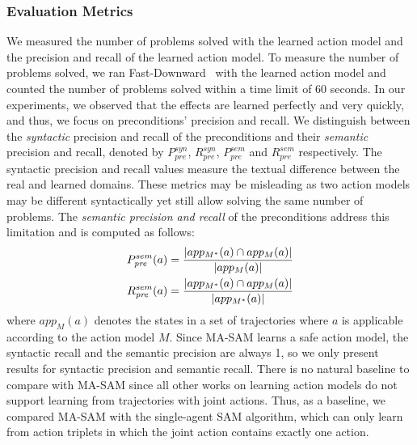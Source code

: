 \documentclass[letterpaper]{article} %
\newcommand{\pre}{\textit{pre}}
\theoremstyle{definition}
\theoremstyle{remark}
\newcommand{\realm}{\ensuremath{M^*}\xspace}
\newcommand{\sam}{\ac{SAM}\xspace}
\newcommand{\masam}{\ac{MA-SAM}\xspace}
\begin{document}
\subsubsection{Evaluation Metrics}
We measured the number of problems solved with the learned action model 
and the precision and recall of the learned action model. 
To measure the number of problems solved, 
we ran Fast-Downward~\cite{helmert2006fast} with 
the learned action model and counted the number of problems solved within a time limit of 60 seconds. %
In our experiments, we observed that the effects are learned perfectly and very quickly, and thus, we focus on preconditions' precision and recall.  
We distinguish between the \textit{syntactic} precision and recall of the preconditions and their \textit{semantic} precision and recall, denoted by $P^{syn}_\pre$, $R^{syn}_\pre$, $P^{sem}_\pre$ and $R^{sem}_\pre$ respectively. 
The syntactic precision and recall values measure the textual difference between the real and learned domains. 
These metrics may be misleading as two action models may be different syntactically yet still allow solving the same number of problems. 
The \textit{semantic precision and recall} of the preconditions address this limitation and is computed as follows:
\begin{align*}\small
    P^{sem}_{\pre}(a)= \frac{|app_{\realm}(a)\cap app_M(a)|}{|app_M(a)|} \\
    R^{sem}_{\pre}(a)= \frac{|app_{\realm}(a)\cap app_M(a)|}{|app_{\realm}(a)|}
\end{align*}
where $app_M(a)$ denotes the states in a set of trajectories where $a$ is applicable according to the action model $M$. 
Since \masam learns a safe action model, the syntactic recall and the semantic precision are always 1, so we only present results for syntactic precision and semantic recall. 
There is no natural baseline to compare with \masam since all other works on learning action models do not support learning from trajectories with joint actions. 
Thus, as a baseline, we compared \masam with the single-agent \sam algorithm, which can only learn from action triplets in which the joint action contains exactly one action. 
\end{document}
